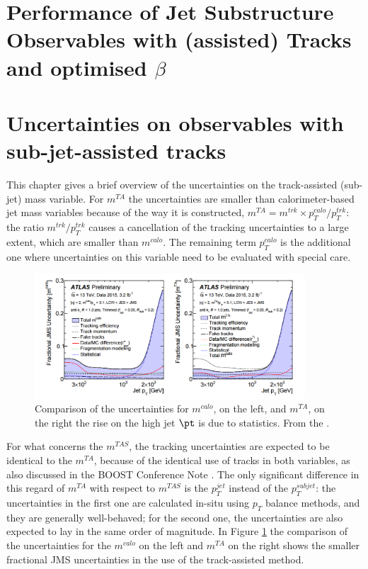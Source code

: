 \documentclass[UKenglish,texlive=2013]{\ATLASLATEXPATH atlasdoc}
\newcommand{\mta}{m^{TA}}
\newcommand{\mtas}{m^{TAS}}
\newcommand{\mcal}{m^{calo}}
\begin{document}
\section{Performance of Jet Substructure Observables with (assisted) Tracks and optimised $\beta$}\label{sec:beta_opt}



\clearpage
\section{Uncertainties on observables with sub-jet-assisted tracks}
This chapter gives a brief overview of the uncertainties on the track-assisted (sub-jet) mass variable. 
For $\mta$ the uncertainties are smaller than calorimeter-based jet mass variables because of the way it is constructed, $\mta=m^{trk}\times p_T^{calo}/p_T^{trk}$: the ratio $m^{trk}/p_T^{trk}$ causes a cancellation of the tracking uncertainties to a large extent, which are smaller than $\mcal$. The remaining term $p_T^{calo}$ is the additional one where uncertainties on this variable need to be evaluated with special care.

\begin{figure}[!ht]
  \centering
      \includegraphics[width=0.9\textwidth]{jet_part/uncert.png}
  \caption[Comparison of the uncertainties for $\mcal$ and $\mta$]{Comparison of the uncertainties for $\mcal$, on the left, and $\mta$, on the right the rise on the high jet $\pt$ is due to statistics. From the \cite{art35}.}
  \label{fig:uncert}
\end{figure}


For what concerns the $\mtas$, the tracking uncertainties are expected to be identical to the $\mta$, because of the identical use of tracks in both variables, as also discussed in the BOOST Conference Note \cite{art35}.
The only significant difference in this regard of $\mta$ with respect to $\mtas$ is the $p_T^{jet}$ instead of the $p_T^{subjet}$: the uncertainties in the first one are calculated in-situ using $p_T$ balance methods, and they are generally well-behaved; for the second one, the uncertainties are also expected to lay in the same order of magnitude. In Figure \ref{fig:uncert} the comparison of the uncertainties for the $\mcal$ on the left and $\mta$ on the right shows the smaller fractional JMS uncertainties in the use of the track-assisted method.
\end{document}
